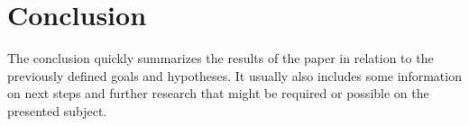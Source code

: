 \chapter{Conclusion}

The conclusion quickly summarizes the results of the paper
in relation to the previously defined goals and hypotheses.
It usually also includes some information on next steps and further research
that might be required or possible on the presented subject.

